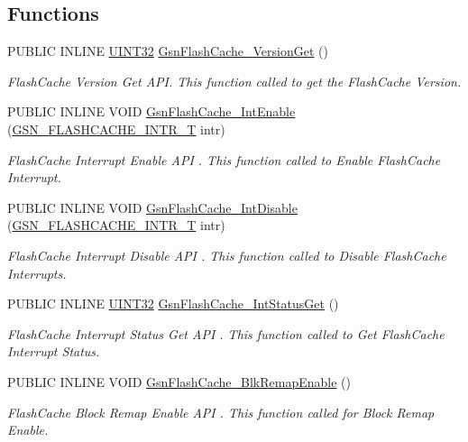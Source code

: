 \subsection*{Functions}
\begin{DoxyCompactItemize}
\item 
PUBLIC INLINE \hyperlink{a00660_gae1e6edbbc26d6fbc71a90190d0266018}{UINT32} \hyperlink{a00646_gac7d33f32920ee2ba878185838df0a101}{GsnFlashCache\_\-VersionGet} ()
\begin{DoxyCompactList}\small\item\em FlashCache Version Get API. This function called to get the FlashCache Version. \end{DoxyCompactList}\item 
PUBLIC INLINE VOID \hyperlink{a00646_gabda7a7203bb87e7f0b2b567bb44dd980}{GsnFlashCache\_\-IntEnable} (\hyperlink{a00646_gae440995d29864b6ceac3862a7d41a3d9}{GSN\_\-FLASHCACHE\_\-INTR\_\-T} intr)
\begin{DoxyCompactList}\small\item\em FlashCache Interrupt Enable API . This function called to Enable FlashCache Interrupt. \end{DoxyCompactList}\item 
PUBLIC INLINE VOID \hyperlink{a00646_ga4c03d4a8a408ccfd0a4b406cdfd12c36}{GsnFlashCache\_\-IntDisable} (\hyperlink{a00646_gae440995d29864b6ceac3862a7d41a3d9}{GSN\_\-FLASHCACHE\_\-INTR\_\-T} intr)
\begin{DoxyCompactList}\small\item\em FlashCache Interrupt Disable API . This function called to Disable FlashCache Interrupts. \end{DoxyCompactList}\item 
PUBLIC INLINE \hyperlink{a00660_gae1e6edbbc26d6fbc71a90190d0266018}{UINT32} \hyperlink{a00646_gadedea6cd7372380413c6aa789848ce6d}{GsnFlashCache\_\-IntStatusGet} ()
\begin{DoxyCompactList}\small\item\em FlashCache Interrupt Status Get API . This function called to Get FlashCache Interrupt Status. \end{DoxyCompactList}\item 
PUBLIC INLINE VOID \hyperlink{a00646_gae032f2e5e9de499ddebeb492bfc8234e}{GsnFlashCache\_\-BlkRemapEnable} ()
\begin{DoxyCompactList}\small\item\em FlashCache Block Remap Enable API . This function called for Block Remap Enable. \end{DoxyCompactList}\item 

\end{DoxyCompactItemize}
